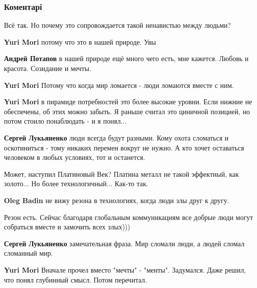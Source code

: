  
 
 
 
 
\subsubsection{Коментарі}

\begin{itemize} %
Всё так. Но почему это сопровождается такой ненавистью между людьми?

\begin{itemize} %
\textbf{Yuri Mori} потому что это в нашей природе. Увы

\textbf{Андрей Потапов} в нашей природе ещё много чего есть, мне кажется. Любовь и красота. Созидание и мечты.

\textbf{Yuri Mori} Потому что когда мир ломается - люди ломаются вместе с ним.

\textbf{Yuri Mori} в пирамиде потребностей это более высокие уровни. Если нижние не обеспечены, об этих можно забыть. Я раньше считал это циничной позицией, но потом стоило понаблюдать - и я понял...

\textbf{Сергей Лукьяненко} люди всегда будут разными. Кому охота сломаться и оскотиниться - тому никаких перемен вокруг не нужно. А кто хочет оставаться человеком в любых условиях, тот и останется.

Может, наступил Платиновый Век? Платина металл не такой эффектный, как золото... Но более технологичный... Как-то так.

\textbf{Oleg Badin} не вижу резона в технологиях, когда люди злы друг к другу.

Резон есть. Сейчас благодаря глобальным коммуникациям все добрые люди могут собраться вместе и замочить всех злых)))

\textbf{Сергей Лукьяненко} замечательная фраза. Мир сломали люди, а людей сломал сломанный мир.

\textbf{Yuri Mori} Вначале прочел вместо "мечты" - "менты". Задумался. Даже решил, что понял глубинный смысл. Потом перечитал.


\end{itemize}
\end{itemize}
